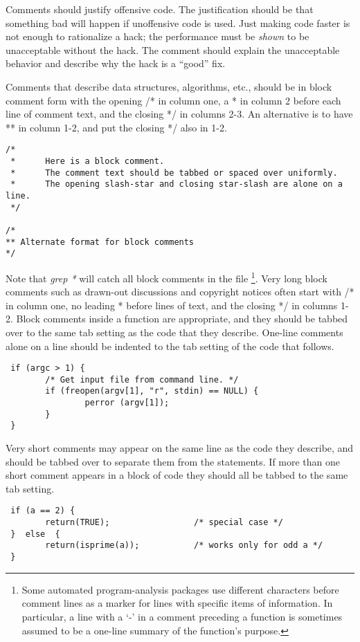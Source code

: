  Comments should justify offensive code. The justification should be that
something bad will happen if unoffensive code is used. Just making code faster
is not enough to rationalize a 
hack; the performance must be {\em shown} to be unacceptable without the hack.
The comment should explain the unacceptable behavior and describe why the hack
is a ``good'' fix. 

 Comments that describe data structures, algorithms, etc., should be in block
comment form with the opening /* in column one, a * in column 2 before each
line of comment text, and the closing */ in columns 2-3. An alternative is to
have ** in column 1-2, and put the closing */ also in 1-2. 

\begin{verbatim}
/*
 *      Here is a block comment.
 *      The comment text should be tabbed or spaced over uniformly.
 *      The opening slash-star and closing star-slash are alone on a line.
 */

/*
** Alternate format for block comments
*/ 
\end{verbatim}

 Note that {\em grep *} will catch all block comments in the file
\footnote{Some automated program-analysis packages use different characters
before comment lines as a marker for lines  with specific items of information.
In particular, a line with a `-' in a comment preceding a function is sometimes
assumed to be a one-line summary of the function's purpose.}. Very long
block comments such as drawn-out discussions and copyright notices often start
with /* in column one, no leading * before lines of text, and the closing */ in
columns 1-2. Block comments inside a function are appropriate, and they should
be tabbed over to the same tab setting as the code that they describe. One-line
comments alone on a line should be indented to the tab setting of the code that
follows.

\begin{verbatim}
 if (argc > 1) {
        /* Get input file from command line. */
        if (freopen(argv[1], "r", stdin) == NULL) {
                perror (argv[1]);
        }
 }
\end{verbatim}

 Very short comments may appear on the same line as the code they describe, and
should be tabbed over to separate them from the statements. If more than one
short comment appears in a block of code they should all be tabbed to the same
tab setting. 

\begin{verbatim}
 if (a == 2) {
        return(TRUE);                 /* special case */
 }  else  {
        return(isprime(a));           /* works only for odd a */
 }
\end{verbatim}
\newpage
